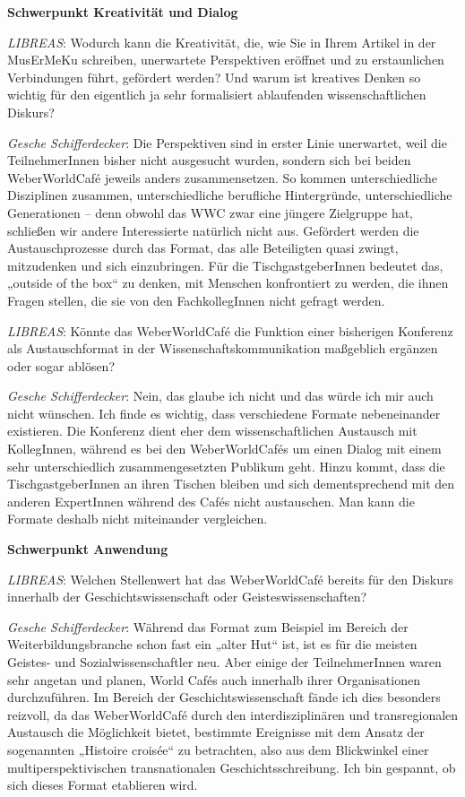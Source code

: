 \documentclass[a4paper,
fontsize=11pt,
oneside,
numbers=noperiodatend,
parskip=half-,
bibliography=totoc,
final
]{scrartcl}
\begin{document}
\textbf{Schwerpunkt Kreativität und Dialog}

\emph{LIBREAS}: Wodurch kann die Kreativität, die, wie Sie in Ihrem
Artikel in der MusErMeKu schreiben, unerwartete Perspektiven eröffnet
und zu erstaunlichen Verbindungen führt, gefördert werden? Und warum ist
kreatives Denken so wichtig für den eigentlich ja sehr formalisiert
ablaufenden wissenschaftlichen Diskurs?

\emph{Gesche Schifferdecker}: Die Perspektiven sind in erster Linie
unerwartet, weil die TeilnehmerInnen bisher nicht ausgesucht wurden,
sondern sich bei beiden WeberWorldCafé jeweils anders zusammensetzen. So
kommen unterschiedliche Disziplinen zusammen, unterschiedliche
berufliche Hintergründe, unterschiedliche Generationen -- denn obwohl
das WWC zwar eine jüngere Zielgruppe hat, schließen wir andere
Interessierte natürlich nicht aus. Gefördert werden die
Austauschprozesse durch das Format, das alle Beteiligten quasi zwingt,
mitzudenken und sich einzubringen. Für die TischgastgeberInnen bedeutet
das, „outside of the box`` zu denken, mit Menschen konfrontiert zu
werden, die ihnen Fragen stellen, die sie von den FachkollegInnen nicht
gefragt werden.

\emph{LIBREAS}: Könnte das WeberWorldCafé die Funktion einer bisherigen
Konferenz als Austauschformat in der Wissenschaftskommunikation
maßgeblich ergänzen oder sogar ablösen?

\emph{Gesche Schifferdecker}: Nein, das glaube ich nicht und das würde
ich mir auch nicht wünschen. Ich finde es wichtig, dass verschiedene
Formate nebeneinander existieren. Die Konferenz dient eher dem
wissenschaftlichen Austausch mit KollegInnen, während es bei den
WeberWorldCafés um einen Dialog mit einem sehr unterschiedlich
zusammengesetzten Publikum geht. Hinzu kommt, dass die
TischgastgeberInnen an ihren Tischen bleiben und sich dementsprechend
mit den anderen ExpertInnen während des Cafés nicht austauschen. Man
kann die Formate deshalb nicht miteinander vergleichen.

\textbf{Schwerpunkt Anwendung}

\emph{LIBREAS}: Welchen Stellenwert hat das WeberWorldCafé bereits für
den Diskurs innerhalb der Geschichtswissenschaft oder
Geisteswissenschaften?

\emph{Gesche Schifferdecker}: Während das Format zum Beispiel im Bereich
der Weiterbildungsbranche schon fast ein „alter Hut`` ist, ist es für
die meisten Geistes- und Sozialwissenschaftler neu. Aber einige der
TeilnehmerInnen waren sehr angetan und planen, World Cafés auch
innerhalb ihrer Organisationen durchzuführen. Im Bereich der
Geschichtswissenschaft fände ich dies besonders reizvoll, da das
WeberWorldCafé durch den interdisziplinären und transregionalen
Austausch die Möglichkeit bietet, bestimmte Ereignisse mit dem Ansatz
der sogenannten „Histoire croisée`` zu betrachten, also aus dem
Blickwinkel einer multiperspektivischen transnationalen
Geschichtsschreibung. Ich bin gespannt, ob sich dieses Format etablieren
wird.
\end{document}
